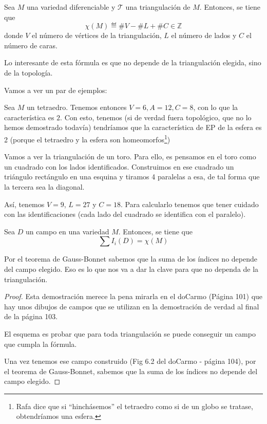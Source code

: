 \begin{defn}
Sea $M$ una variedad diferenciable y $\mathcal{T}$ una triangulación de $M$. Entonces, se tiene que \[ \chi(M) ≝ \#V - \#L + \#C ∈ℤ \] donde $V$ el número de vértices de la triangulación, $L$ el número de lados y $C$ el número de caras.
\end{defn}

Lo interesante de esta fórmula es que no depende de la triangulación elegida, sino de la topología.

Vamos a ver un par de ejemplos:

\begin{example}
Sea $M$ un tetraedro. Tenemos entonces $V=6,A=12,C=8$, con lo que la característica es $2$. Con esto, tenemos (si de verdad fuera topológico, que no lo hemos demostrado todavía) tendríamos que la característica de EP de la esfera es 2 (porque el tetraedro y la esfera son homeomorfos\footnote{Rafa dice que si ``hinchásemos'' el tetraedro como si de un globo se tratase, obtendríamos una esfera.})
\end{example}

\begin{example}

Vamos a ver la triangulación de un toro. Para ello, es pensamos en el toro como un cuadrado con los lados identificados. Construimos en ese cuadrado un triángulo rectángulo en una esquina y tiramos 4 paralelas a esa, de tal forma que la tercera sea la diagonal.

Así, tenemos $V=9$, $L=27$ y $C=18$. Para calcularlo tenemos que tener cuidado con las identificaciones (cada lado del cuadrado se identifica con el paralelo).
\end{example}


\begin{theorem}
Sea $D$ un campo en una variedad $M$. Entonces, se tiene que \[ \sum I_i(D) = χ(M) \]
\end{theorem}

Por el teorema de Gauss-Bonnet sabemos que la suma de los índices no depende del campo elegido. Eso es lo que nos va a dar la clave para que no dependa de la triangulación.

\begin{proof}
Esta demostración merece la pena mirarla en el doCarmo (Página 101) que hay unos dibujos de campos que se utilizan en la demostración de verdad al final de la página 103.

El esquema es probar que para toda triangulación se puede conseguir un campo que cumpla la fórmula.

Una vez tenemos ese campo construido (Fig 6.2 del doCarmo - página 104), por el teorema de Gauss-Bonnet, sabemos que la suma de los índices no depende del campo elegido.
\end{proof}


